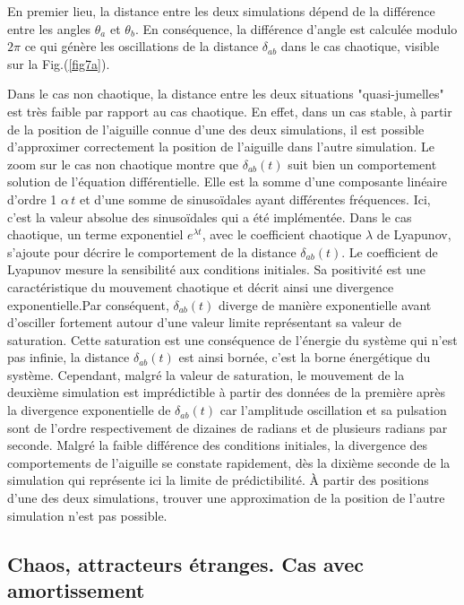 \documentclass[a4paper,12pt,twoside]{article}
\begin{document}
En premier lieu, la distance entre les deux simulations dépend de la différence entre les angles $\theta_a$ et $\theta_b$. En conséquence, la différence d'angle est calculée modulo $2\pi$ ce qui génère les oscillations de la distance $\delta_{ab}$ dans le cas chaotique, visible sur la Fig.(\ref{fig7a}).

Dans le cas non chaotique, la distance entre les deux situations "quasi-jumelles" est très faible par rapport au cas chaotique. En effet, dans un cas stable, à partir de la position de l'aiguille connue d'une des deux simulations, il est possible d'approximer correctement la position de l'aiguille dans l'autre simulation. Le zoom sur le cas non chaotique montre que $\delta _{ab}(t)$ suit bien un comportement solution de l'équation différentielle. Elle est la somme d'une composante linéaire d'ordre 1 $\alpha\,t$ et d'une somme de sinusoïdales ayant différentes fréquences. Ici, c'est la valeur absolue des sinusoïdales qui a été implémentée. Dans le cas chaotique, un terme exponentiel $e^{\lambda t}$, avec le coefficient chaotique $\lambda$ de Lyapunov, s'ajoute pour décrire le comportement de la distance $\delta _{ab}(t)$. Le coefficient de Lyapunov mesure la sensibilité aux conditions initiales. Sa positivité est une caractéristique du mouvement chaotique et décrit ainsi une divergence exponentielle.Par conséquent, $\delta _{ab}(t)$ diverge de manière exponentielle  avant d'osciller fortement autour d'une valeur limite représentant sa valeur de saturation. Cette saturation est une conséquence de l'énergie du système qui n'est pas infinie, la distance $\delta _{ab}(t)$ est ainsi bornée, c'est la borne énergétique du système. Cependant, malgré la valeur de saturation, le mouvement de la deuxième simulation est imprédictible à partir des données de la première après la divergence exponentielle de $\delta _{ab}(t)$ car l'amplitude oscillation et sa pulsation sont de l'ordre respectivement de dizaines de radians et de plusieurs radians par seconde. Malgré la faible différence des conditions initiales, la divergence des comportements de l'aiguille se constate rapidement, dès la dixième seconde de la simulation qui représente ici la limite de prédictibilité. À partir des positions d'une des deux simulations, trouver une approximation de la position de l'autre simulation n'est pas possible.

\subsection{Chaos, attracteurs étranges. Cas avec amortissement}
\end{document}
